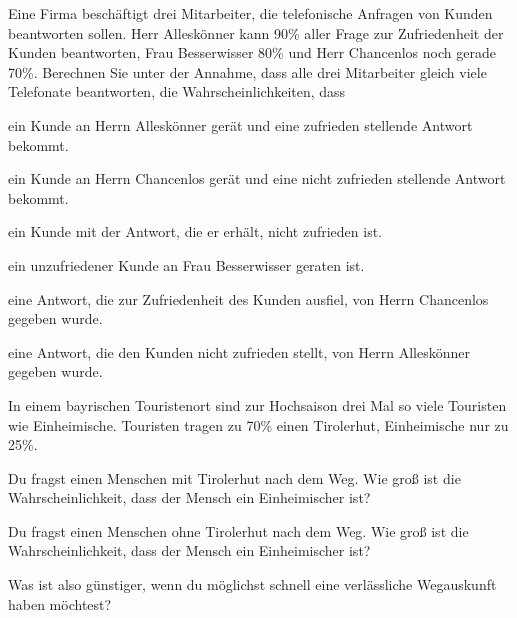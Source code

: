 \documentclass[%
11pt,%
twoside,%
titlepage,%
german,%
headsepline%
]{scrartcl}
\begin{document}
\begin{ueb}
Eine Firma beschäftigt drei Mitarbeiter, die telefonische Anfragen von Kunden beantworten sollen. Herr Alleskönner kann 90\% aller Frage zur Zufriedenheit der Kunden beantworten, Frau Besserwisser 80\% und Herr Chancenlos noch gerade 70\%. Berechnen Sie unter der Annahme, dass alle drei Mitarbeiter gleich viele Telefonate beantworten, die Wahrscheinlichkeiten, dass

\begin{enumeratea}
\item ein Kunde an Herrn Alleskönner gerät und eine zufrieden stellende Antwort bekommt.
\item ein Kunde an Herrn Chancenlos gerät und eine nicht zufrieden stellende Antwort
bekommt.
\item ein Kunde mit der Antwort, die er erhält, nicht zufrieden ist.
\item ein unzufriedener Kunde an Frau Besserwisser geraten ist.
\item eine Antwort, die zur Zufriedenheit des Kunden ausfiel, von Herrn Chancenlos
gegeben wurde.
\item eine Antwort, die den Kunden nicht zufrieden stellt, von Herrn Alleskönner gegeben
wurde.
\end{enumeratea}
\end{ueb}

\begin{ueb}
In einem bayrischen Touristenort sind zur Hochsaison drei Mal so viele Touristen wie Einheimische. Touristen tragen zu 70\% einen Tirolerhut, Einheimische nur zu 25\%.
\begin{enumeratea}
\item Du fragst einen Menschen mit Tirolerhut nach dem Weg. Wie groß ist die Wahrscheinlichkeit, dass der
Mensch ein Einheimischer ist?
\item Du fragst einen Menschen ohne Tirolerhut nach dem Weg. Wie groß ist die Wahrscheinlichkeit, dass
der Mensch ein Einheimischer ist?
\end{enumeratea}
Was ist also günstiger, wenn du möglichst schnell eine verlässliche Wegauskunft haben möchtest?
\end{ueb}
\end{document}

